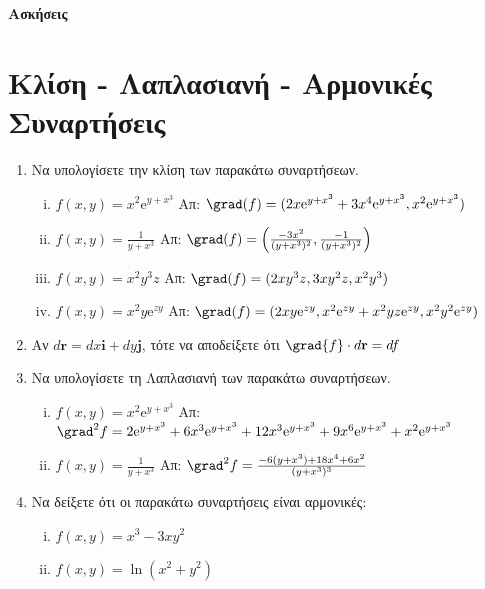 


\geometry{top=2cm}
\pagestyle{askhseis}
\everymath{\displaystyle}




\begin{center}
  {\color{Col1}\bfseries\large Ασκήσεις}
\end{center} 


\section*{Κλίση - Λαπλασιανή - Αρμονικές Συναρτήσεις}

\begin{enumerate}
  \item Να υπολογίσετε την κλίση των παρακάτω συναρτήσεων.
    \begin{enumerate}[i)]
      \item $ f(x,y) = x^{2} \mathrm{e}^{y+x^{3}} $ 
        \hfill Απ: $ \grad(f) = (2x\mathrm{e}^{y+x^{3}}+3x^{4}\mathrm{e}^{y+x^{3}}, 
        x^{2} \mathrm{e}^{y+x^{3}}) $ 
      \item $ f(x,y) = \frac{1}{y+x^{3}} $ 
        \hfill Απ: $\grad(f) =\left(\frac{-3x^{2}}{(y+x^{3})^{2}},
        \frac{-1}{(y+x^{3})^{2}}\right)$ 
      \item $ f(x,y) = x^{2}y^{3}z $   
        \hfill Απ: $ \grad(f) = (2xy^{3}z,3xy^{2}z,x^{2}y^{3}) $ 
      \item $ f(x,y) = x^{2} y \mathrm{e}^{zy}  $ 
        \hfill Απ: $ \grad(f) = (2xy\mathrm{e}^{zy},
        x^{2}\mathrm{e}^{zy}+x^{2}yz\mathrm{e}^{zy},x^{2}y^{2} \mathrm{e}^{zy})$ 
    \end{enumerate}

  \item Αν $ d\mathbf{r} = dx \mathbf{i}+ dy \mathbf{j}$, τότε να αποδείξετε ότι 
    $ \grad{f} \cdot d \mathbf{r} = df $

  \item Να υπολογίσετε τη Λαπλασιανή των παρακάτω συναρτήσεων.
    \begin{enumerate}[i)]
      \item $ f(x,y) = x^{2} \mathrm{e}^{y+x^{3}} $ 
        \hfill Απ: $ \grad^{2} f = 2 \mathrm{e}^{y+x^{3}} + 6x^{3} \mathrm{e}^{y+x^{3}} 
        + 12x^{3} \mathrm{e}^{y+x^{3}} + 9x^{6} \mathrm{e}^{y+x^{3}} + x^{2}
        \mathrm{e}^{y+x^{3}} $ 
      \item $ f(x,y) = \frac{1}{y+x^{3}} $
        \hfill Απ: $ \grad^{2}f = \frac{-6(y+x^{3})+18x^{4}+6x^{2}}{(y+x^{3})^{3}} $ 
    \end{enumerate}

  \item Να δείξετε ότι οι παρακάτω συναρτήσεις είναι αρμονικές:
    \begin{enumerate}[(i)]
      \item $ f(x,y) = x^{3}-3xy^{2} $
      \item $ f(x,y) = \ln(x^{2} + y^{2}) $
    \end{enumerate}
\end{enumerate}

